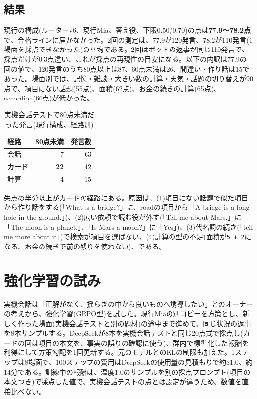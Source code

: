 \documentclass[a4paper,11pt]{article}
\begin{document}
\subsection{結果}
現行の構成(ルーターv6、現行Mia、答え役、下限0.50/0.70)の点は\textbf{77.9〜78.2点}で、合格ラインに届かなかった。2回の測定は、77.9が120発言、78.2が110発言(1場面を採点できなかった)の平均である。2回はボットの返事が同じ110発言で、採点だけが0.3点違い、これが採点の再現性の目安になる。以下の内訳は77.9の回の値で、120発言のうち80点以上は87、60点未満は26、間違い・作り話は15であった。場面別では、記憶・雑談・大きい数の計算・天気・話題の切り替えが90点で、項目にない話題(55点)、面積(62点)、お金の続きの計算(65点)、accordion(66点)が低かった。

\begin{table}[H]\centering\small
\caption{実機会話テストで80点未満だった発言(現行構成、経路別)}\label{tab:live}
\begin{tabular}{lrr}\toprule
経路 & 80点未満 & 発言数\\\midrule
会話 & 7 & 63\\
\textbf{カード} & \textbf{22} & 42\\
計算 & 4 & 15\\\bottomrule
\end{tabular}\end{table}

失点の半分以上がカードの経路にある。原因は、(1)項目にない話題で似た項目から作り話をする(「What is a bridge?」に、roadの項目から「A bridge is a long hole in the ground.」)、(2)広い依頼で読む役が外す(「Tell me about Mars.」に「The moon is a planet.」、「Is Mars a moon?」に「Yes」)、(3)代名詞の続き(「tell me more about it」)で検索が項目を選ばない、(4)計算の型の不足(面積が\texttt{5 + 2}になる、お金の続きで前の残りを使わない)、である。

\section{強化学習の試み}\label{sec:rl}
実機会話は「正解がなく、揺らぎの中から良いものへ誘導したい」とのオーナーの考えから、強化学習(GRPO型\cite{grpo})を試した。現行Miaの別コピーを方策とし、新しく作った場面(実機会話テストと別の題材)の途中まで進めて、同じ状況の返事を8本サンプルする。DeepSeekが8本を実機会話テストと同じ20点式で採点し(カードの回は項目の本文を、事実の誤りの確認に使う)、群内で標準化した報酬を利得にして方策勾配を1回更新する。元のモデルとのKLの制限も加えた。1ステップは8場面で、100ステップの費用はDeepSeekの使用量の見積もりで約\$1.0、約14分である。訓練中の報酬は、温度1.0のサンプルを別の採点プロンプト(項目の本文つき)で採点した値で、実機会話テストの点とは設定が違うため、数値を直接比べない。
\end{document}
